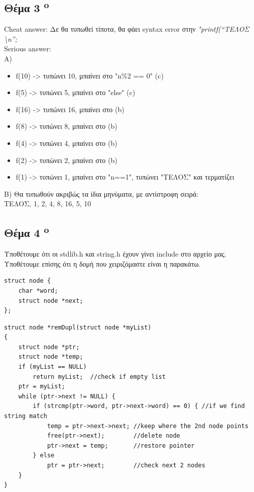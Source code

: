 \documentclass[a4paper,10pt]{article}
\begin{document}
\subsection{Θέμα 3 \textsuperscript{o}}
Cheat answer:
Δε θα τυπωθεί τίποτα, θα φάει syntax error στην \textit{"printf(“ΤΕΛΟΣ
\textbackslash{}n”;} \\

Serious answer:\\
A)
\begin{itemize}
    \item f(10) -> τυπώνει 10, μπαίνει στο "n\%2 == 0" (c)
    \item f(5)  -> τυπώνει 5,  μπαίνει στο "else" (c)
    \item f(16) -> τυπώνει 16,  μπαίνει στο (b)
    \item f(8)  -> τυπώνει 8,  μπαίνει στο (b)
    \item f(4)  -> τυπώνει 4,  μπαίνει στο (b)
    \item f(2)  -> τυπώνει 2,  μπαίνει στο (b)
    \item f(1)  -> τυπώνει 1,  μπαίνει στο "n==1", τυπώνει "ΤΕΛΟΣ" και τερματίζει
\end{itemize}

B) Θα τυπωθούν ακριβώς τα ίδια μηνύματα, με αντίστροφη σειρά:\\
ΤΕΛΟΣ, 1, 2, 4, 8, 16, 5, 10

\subsection{Θέμα 4 \textsuperscript{o}}

Υποθέτουμε ότι οι stdlib.h και string.h έχουν γίνει include στο αρχείο μας.\\
Υποθέτουμε επίσης ότι η δομή που χειριζόμαστε είναι η παρακάτω.

\begin{verbatim}
struct node {
    char *word;
    struct node *next;
};
\end{verbatim}

\begin{verbatim}
struct node *remDupl(struct node *myList)
{
    struct node *ptr;
    struct node *temp;
    if (myList == NULL)
        return myList;  //check if empty list
    ptr = myList;
    while (ptr->next != NULL) {
        if (strcmp(ptr->word, ptr->next->word) == 0) { //if we find string match
            temp = ptr->next->next; //keep where the 2nd node points
            free(ptr->next);        //delete node
            ptr->next = temp;       //restore pointer
        } else
            ptr = ptr->next;        //check next 2 nodes
    }
}
\end{verbatim}
\end{document}
